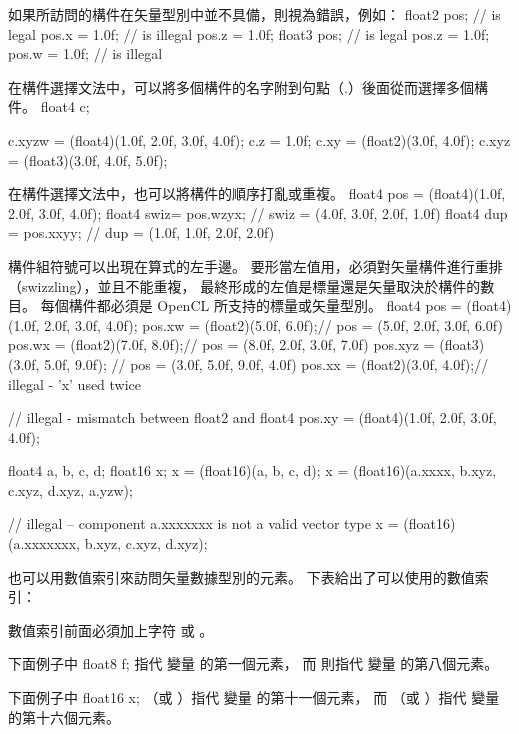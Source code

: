 如果所訪問的構件在矢量型別中並不具備，則視為錯誤，例如：
\startclc
float2 pos;	// is legal
pos.x = 1.0f;	// is illegal
pos.z = 1.0f;
float3 pos;	// is legal
pos.z = 1.0f;
pos.w = 1.0f;	// is illegal
\stopclc

在構件選擇文法中，可以將多個構件的名字附到句點（.）後面從而選擇多個構件。
\startclc
float4 c;

c.xyzw = (float4)(1.0f, 2.0f, 3.0f, 4.0f);
c.z = 1.0f;
c.xy = (float2)(3.0f, 4.0f);
c.xyz = (float3)(3.0f, 4.0f, 5.0f);
\stopclc

在構件選擇文法中，也可以將構件的順序打亂或重複。
\startclc
float4 pos = (float4)(1.0f, 2.0f, 3.0f, 4.0f);
float4 swiz= pos.wzyx; // swiz = (4.0f, 3.0f, 2.0f, 1.0f)
float4 dup = pos.xxyy; // dup = (1.0f, 1.0f, 2.0f, 2.0f)
\stopclc

構件組符號可以出現在算式的左手邊。
要形當左值用，必須對矢量構件進行重排（swizzling），並且不能重複，
最終形成的左值是標量還是矢量取決於構件的數目。
每個構件都必須是 OpenCL 所支持的標量或矢量型別。
\startclc
float4 pos = (float4)(1.0f, 2.0f, 3.0f, 4.0f);
pos.xw = (float2)(5.0f, 6.0f);// pos = (5.0f, 2.0f, 3.0f, 6.0f)
pos.wx = (float2)(7.0f, 8.0f);// pos = (8.0f, 2.0f, 3.0f, 7.0f)
pos.xyz = (float3)(3.0f, 5.0f, 9.0f); // pos = (3.0f, 5.0f, 9.0f, 4.0f)
pos.xx = (float2)(3.0f, 4.0f);// illegal - 'x' used twice

// illegal - mismatch between float2 and float4
pos.xy = (float4)(1.0f, 2.0f, 3.0f, 4.0f);

float4 a, b, c, d;
float16 x;
x = (float16)(a, b, c, d);
x = (float16)(a.xxxx, b.xyz, c.xyz, d.xyz, a.yzw);

// illegal – component a.xxxxxxx is not a valid vector type
x = (float16)(a.xxxxxxx, b.xyz, c.xyz, d.xyz);
\stopclc

也可以用數值索引來訪問矢量數據型別的元素。
下表給出了可以使用的數值索引：

{}

數值索引前面必須加上字符  或 。

下面例子中
\startclc
float8	f;
\stopclc
{} 指代  變量  的第一個元素，
而  則指代  變量  的第八個元素。

下面例子中
\startclc
float16	x;
\stopclc
{} （或 ）指代  變量  的第十一個元素，
而  （或 ）指代  變量  的第十六個元素。

